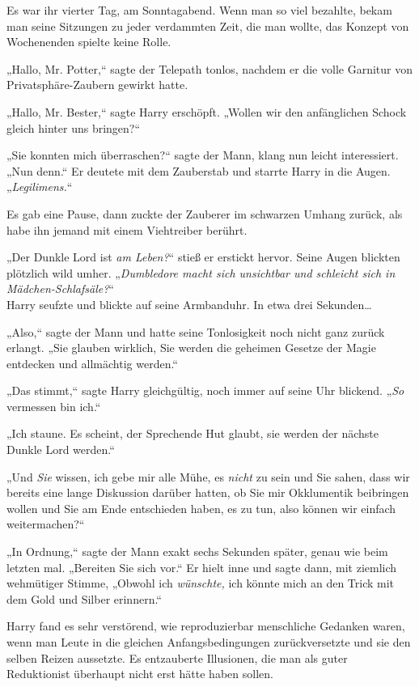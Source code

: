 {Es war ihr vierter Tag, am Sonntagabend. Wenn man so viel bezahlte, bekam man seine Sitzungen zu jeder verdammten Zeit, die man wollte, das Konzept von Wochenenden spielte keine Rolle.

„Hallo, Mr. Potter,“ sagte der Telepath tonlos, nachdem er die volle Garnitur von Privatsphäre-Zaubern gewirkt hatte.

„Hallo, Mr. Bester,“ sagte Harry erschöpft. „Wollen wir den anfänglichen Schock gleich hinter uns bringen?“

„Sie konnten mich überraschen?“ sagte der Mann, klang nun leicht interessiert. „Nun denn.“ Er deutete mit dem Zauberstab und starrte Harry in die Augen. „\emph{Legilimens.}“

Es gab eine Pause, dann zuckte der Zauberer im schwarzen Umhang zurück, als habe ihn jemand mit einem Viehtreiber berührt.

„Der Dunkle Lord ist \emph{am Leben?}“ stieß er erstickt hervor. Seine Augen blickten plötzlich wild umher. „\emph{Dumbledore macht sich unsichtbar und schleicht sich in Mädchen-Schlafsäle?}“\\ Harry seufzte und blickte auf seine Armbanduhr. In etwa drei Sekunden…

„Also,“ sagte der Mann und hatte seine Tonlosigkeit noch nicht ganz zurück erlangt. „Sie glauben wirklich, Sie werden die geheimen Gesetze der Magie entdecken und allmächtig werden.“

„Das stimmt,“ sagte Harry gleichgültig, noch immer auf seine Uhr blickend. „\emph{So} vermessen bin ich.“

„Ich staune. Es scheint, der Sprechende Hut glaubt, sie werden der nächste Dunkle Lord werden.“

„Und \emph{Sie} wissen, ich gebe mir alle Mühe, es \emph{nicht} zu sein und Sie sahen, dass wir bereits eine lange Diskussion darüber hatten, ob Sie mir Okklumentik beibringen wollen und Sie am Ende entschieden haben, es zu tun, also können wir einfach weitermachen?“

„In Ordnung,“ sagte der Mann exakt sechs Sekunden später, genau wie beim letzten mal. „Bereiten Sie sich vor.“ Er hielt inne und sagte dann, mit ziemlich wehmütiger Stimme, „Obwohl ich \emph{wünschte,} ich könnte mich an den Trick mit dem Gold und Silber erinnern.“

Harry fand es sehr verstörend, wie reproduzierbar menschliche Gedanken waren, wenn man Leute in die gleichen Anfangsbedingungen zurückversetzte und sie den selben Reizen aussetzte. Es entzauberte Illusionen, die man als guter Reduktionist überhaupt nicht erst hätte haben sollen.

}
